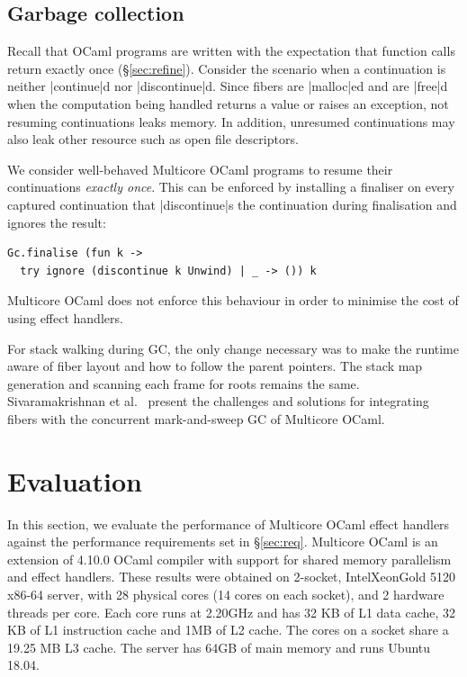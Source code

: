 \documentclass[sigplan,10pt,review,anonymous]{acmart}\settopmatter{printfolios=true,printccs=false,printacmref=false}
\begin{document}
\subsection{Garbage collection}

Recall that OCaml programs are written with the expectation that function calls
return exactly once (\S\ref{sec:refine}). Consider the scenario when a
continuation is neither |continue|d nor |discontinue|d. Since fibers are
|malloc|ed and are |free|d when the computation being handled returns a value
or raises an exception, not resuming continuations leaks memory. In addition,
unresumed continuations may also leak other resource such as open file
descriptors.

We consider well-behaved Multicore OCaml programs to resume their continuations
\emph{exactly once}. This can be enforced by installing a finaliser on every
captured continuation that |discontinue|s the continuation during finalisation
and ignores the result:
\begin{lstlisting}
Gc.finalise (fun k ->
  try ignore (discontinue k Unwind) | _ -> ()) k
\end{lstlisting}
Multicore OCaml does not enforce this behaviour in order to minimise the cost
of using effect handlers.

For stack walking during GC, the only change necessary was to make the runtime
aware of fiber layout and how to follow the parent pointers. The stack map
generation and scanning each frame for roots remains the same. Sivaramakrishnan
et al.~\cite{RetroParallel} present the challenges and solutions for
integrating fibers with the concurrent mark-and-sweep GC of Multicore OCaml.

\section{Evaluation}
\label{sec:eval}

In this section, we evaluate the performance of Multicore OCaml effect handlers
against the performance requirements set in \S\ref{sec:req}. Multicore OCaml is
an extension of 4.10.0 OCaml compiler with support for shared memory
parallelism and effect handlers. These results were obtained on 2-socket,
Intel\textregistered Xeon\textregistered Gold 5120 x86-64 server, with 28
physical cores (14 cores on each socket), and 2 hardware threads per core. Each
core runs at 2.20GHz and has 32 KB of L1 data cache, 32 KB of L1 instruction
cache and 1MB of L2 cache. The cores on a socket share a 19.25 MB L3 cache. The
server has 64GB of main memory and runs Ubuntu 18.04.
\end{document}
